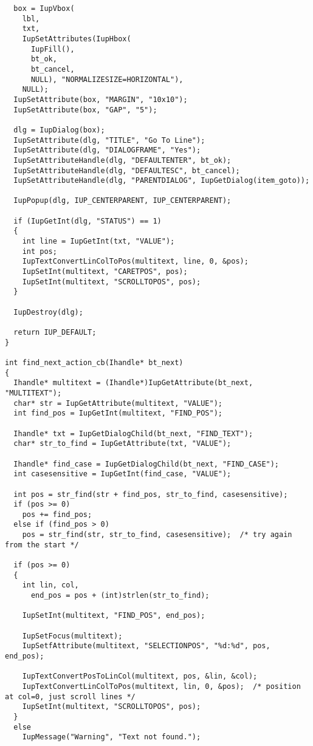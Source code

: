 \documentclass{ctexart}
\begin{document}
\begin{lstlisting}
  box = IupVbox(
    lbl,
    txt,
    IupSetAttributes(IupHbox(
      IupFill(),
      bt_ok,
      bt_cancel,
      NULL), "NORMALIZESIZE=HORIZONTAL"),
    NULL);
  IupSetAttribute(box, "MARGIN", "10x10");
  IupSetAttribute(box, "GAP", "5");

  dlg = IupDialog(box);
  IupSetAttribute(dlg, "TITLE", "Go To Line");
  IupSetAttribute(dlg, "DIALOGFRAME", "Yes");
  IupSetAttributeHandle(dlg, "DEFAULTENTER", bt_ok);
  IupSetAttributeHandle(dlg, "DEFAULTESC", bt_cancel);
  IupSetAttributeHandle(dlg, "PARENTDIALOG", IupGetDialog(item_goto));

  IupPopup(dlg, IUP_CENTERPARENT, IUP_CENTERPARENT);

  if (IupGetInt(dlg, "STATUS") == 1)
  {
    int line = IupGetInt(txt, "VALUE");
    int pos;
    IupTextConvertLinColToPos(multitext, line, 0, &pos);
    IupSetInt(multitext, "CARETPOS", pos);
    IupSetInt(multitext, "SCROLLTOPOS", pos);
  }

  IupDestroy(dlg);

  return IUP_DEFAULT;
}

int find_next_action_cb(Ihandle* bt_next)
{
  Ihandle* multitext = (Ihandle*)IupGetAttribute(bt_next, "MULTITEXT");
  char* str = IupGetAttribute(multitext, "VALUE");
  int find_pos = IupGetInt(multitext, "FIND_POS");

  Ihandle* txt = IupGetDialogChild(bt_next, "FIND_TEXT");
  char* str_to_find = IupGetAttribute(txt, "VALUE");

  Ihandle* find_case = IupGetDialogChild(bt_next, "FIND_CASE");
  int casesensitive = IupGetInt(find_case, "VALUE");

  int pos = str_find(str + find_pos, str_to_find, casesensitive);
  if (pos >= 0)
    pos += find_pos;
  else if (find_pos > 0)
    pos = str_find(str, str_to_find, casesensitive);  /* try again from the start */

  if (pos >= 0)
  {
    int lin, col, 
      end_pos = pos + (int)strlen(str_to_find);

    IupSetInt(multitext, "FIND_POS", end_pos);

    IupSetFocus(multitext);
    IupSetfAttribute(multitext, "SELECTIONPOS", "%d:%d", pos, end_pos);

    IupTextConvertPosToLinCol(multitext, pos, &lin, &col);
    IupTextConvertLinColToPos(multitext, lin, 0, &pos);  /* position at col=0, just scroll lines */
    IupSetInt(multitext, "SCROLLTOPOS", pos);
  }
  else
    IupMessage("Warning", "Text not found.");





\end{lstlisting}
\end{document}
